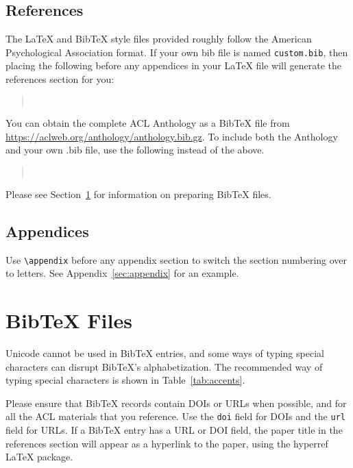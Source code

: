 \documentclass[11pt]{article}
\begin{document}
\subsection{References}

\nocite{Ando2005,augenstein-etal-2016-stance,andrew2007scalable,rasooli-tetrault-2015,goodman-etal-2016-noise,harper-2014-learning}

The \LaTeX{} and Bib\TeX{} style files provided roughly follow the American Psychological Association format.
If your own bib file is named \texttt{custom.bib}, then placing the following before any appendices in your \LaTeX{} file will generate the references section for you:
\begin{quote}
\begin{verbatim}


\end{verbatim}
\end{quote}
You can obtain the complete ACL Anthology as a Bib\TeX{} file from \url{https://aclweb.org/anthology/anthology.bib.gz}.
To include both the Anthology and your own .bib file, use the following instead of the above.
\begin{quote}
\begin{verbatim}


\end{verbatim}
\end{quote}
Please see Section~\ref{sec:bibtex} for information on preparing Bib\TeX{} files.

\subsection{Appendices}

Use \verb|\appendix| before any appendix section to switch the section numbering over to letters. See Appendix~\ref{sec:appendix} for an example.

\section{Bib\TeX{} Files}
\label{sec:bibtex}

Unicode cannot be used in Bib\TeX{} entries, and some ways of typing special characters can disrupt Bib\TeX's alphabetization. The recommended way of typing special characters is shown in Table~\ref{tab:accents}.

Please ensure that Bib\TeX{} records contain DOIs or URLs when possible, and for all the ACL materials that you reference.
Use the \verb|doi| field for DOIs and the \verb|url| field for URLs.
If a Bib\TeX{} entry has a URL or DOI field, the paper title in the references section will appear as a hyperlink to the paper, using the hyperref \LaTeX{} package.
\end{document}
